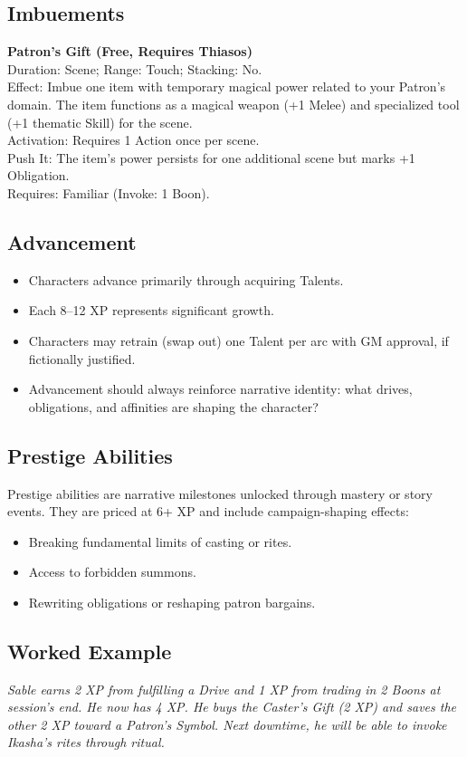 \subsection{Imbuements}
\textbf{Patron’s Gift (Free, Requires Thiasos)}\\
Duration: Scene; Range: Touch; Stacking: No.\\
Effect: Imbue one item with temporary magical power related to your Patron’s domain. The item functions as a magical weapon (+1 Melee) and specialized tool (+1 thematic Skill) for the scene.\\
Activation: Requires 1 Action once per scene.\\
Push It: The item’s power persists for one additional scene but marks +1 Obligation.\\
Requires: Familiar (Invoke: 1 Boon).

\subsection{Advancement}
\begin{itemize}
  \item Characters advance primarily through acquiring Talents.
  \item Each 8–12 XP represents significant growth.
  \item Characters may retrain (swap out) one Talent per arc with GM approval, if fictionally justified.
  \item Advancement should always reinforce narrative identity: what drives, obligations, and affinities are shaping the character?
\end{itemize}

\subsection{Prestige Abilities}
Prestige abilities are narrative milestones unlocked through mastery or story events. They are priced at 6+ XP and include campaign-shaping effects:
\begin{itemize}
  \item Breaking fundamental limits of casting or rites.
  \item Access to forbidden summons.
  \item Rewriting obligations or reshaping patron bargains.
\end{itemize}

\subsection{Worked Example}
\emph{Sable earns 2 XP from fulfilling a Drive and 1 XP from trading in 2 Boons at session’s end. He now has 4 XP. He buys the Caster’s Gift (2 XP) and saves the other 2 XP toward a Patron’s Symbol. Next downtime, he will be able to invoke Ikasha’s rites through ritual.}
